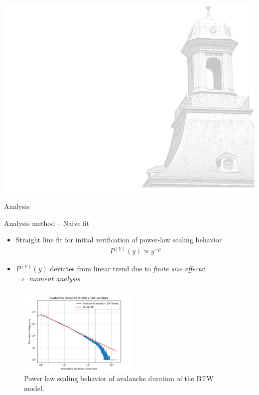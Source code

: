 \documentclass[xcolor=dvipsnames]{beamer}
\begin{document}
	
	{\usebackgroundtemplate%
		{%
			\includegraphics[width=\paperwidth,height=\paperheight]{bkg1.pdf}%
		}
		\begin{frame}
			\centering \Huge \color{ublue} Analysis
			\thispagestyle{empty}
			\addtocounter{framenumber}{-1}
		\end{frame}
	}
	
	\begin{frame}{Analysis method -- Naive fit}
		\begin{itemize}
			\item {Straight line fit for initial verification of power-law scaling behavior
				\begin{align*}
				P^{(Y)}(y) \propto y^{-\rho}
				\end{align*}
				}
			\item {$P^{(Y)}(y)$ deviates from linear trend due to \textit{finite size effects}:\\ $\Rightarrow$ \textit{moment analysis}}
		\end{itemize}
		\begin{figure}[h]
			\captionsetup{width=\textwidth}
			\centering
			\includegraphics[width=0.51\textwidth]{naive_fit.pdf}
			\caption{Power law scaling behavior of avalanche duration of the BTW model.}
		\end{figure}
	\end{frame}
	
\end{document}
